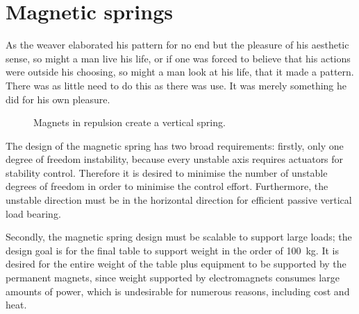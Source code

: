 \chapter{Magnetic springs}


\epigraph{As the weaver elaborated his pattern for no end but the
pleasure of his aesthetic sense, so might a man live his life, or if one
was forced to believe that his actions were outside his choosing, so might
a man look at his life, that it made a pattern. There was as little need
to do this as there was use. It was merely something he did for his own
pleasure.}{\textcite{maugham1915}}

\begin{figure}
  \caption{Magnets in repulsion create a vertical spring.}
\end{figure}

The design of the magnetic spring has two broad requirements: firstly,
only one degree of freedom instability, because every unstable axis
requires actuators for stability control. Therefore it is desired to
minimise the number of unstable degrees of freedom in order to
minimise the control effort. Furthermore, the unstable direction must
be in the horizontal direction for efficient passive vertical load
bearing.

Secondly, the magnetic spring design must be scalable to support large
loads; the design goal is for the final table to support weight in the
order of \SI{100}{kg}. It is desired for the entire weight of the
table plus equipment to be supported by the permanent magnets, since
weight supported by electromagnets consumes large amounts of power,
which is undesirable for numerous reasons, including cost and heat.


